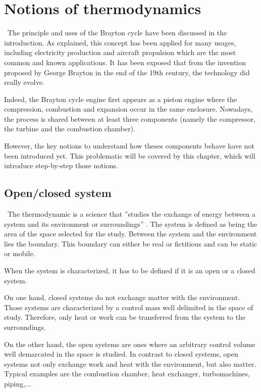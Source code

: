 \graphicspath{{Chapitre_2/Images/}}
\chapter{Notions of thermodynamics}\label{C2}
\quad\, The principle and uses of the Brayton cycle have been discussed in the introduction. As explained, this concept has been applied for many usages, including electricity production and aircraft propulsion which are the most common and known applications. It has been exposed that from the invention proposed by George Brayton in the end of the 19th century, the technology did really evolve.

Indeed, the Brayton cycle engine first appears as a  piston engine where the compression, combustion and expansion occur in the same enclosure. Nowadays, the process is shared between at least three components (namely the compressor, the turbine and the combustion chamber).

However, the key notions to understand how theses components behave have not been introduced yet. This problematic will be covered by this chapter, which will introduce step-by-step those notions.
\section{Open/closed system}\label{sect:C2_Sys}
\quad\,  The thermodynamic is a science that ''studies the exchange of energy between a system and its environment or surroundings'' \cite{thermoApp_1}.
The system is defined as being the area of the space selected for the study. Between the system and the environment lies the boundary. This boundary can either be real or fictitious and can be static or mobile.

When the system is characterized, it has to be defined if it is an open or a closed system.

On one hand, closed systems do not exchange matter with the environment. Those systems are characterized by a control mass well delimited in the space of study. Therefore, only heat or work can be transferred from the system to the surroundings.

On the other hand, the open systems are ones where an arbitrary control volume well demarcated in the space is studied. In contrast to closed systems, open systems not only exchange work and heat with the environment, but also matter. Typical examples are the combustion chamber, heat exchanger, turbomachines, piping,...

